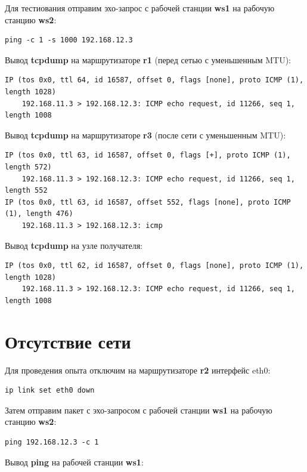 \documentclass[a4paper,12pt]{article}
\begin{document}
Для тестиования отправим эхо-запрос с рабочей станции \textbf{ws1} на рабочую станцию
\textbf{ws2}:

\begin{Verbatim}
ping -c 1 -s 1000 192.168.12.3
\end{Verbatim}

Вывод \textbf{tcpdump} на маршрутизаторе \textbf{r1} (перед сетью с уменьшенным MTU):

\begin{Verbatim}
IP (tos 0x0, ttl 64, id 16587, offset 0, flags [none], proto ICMP (1), length 1028)
    192.168.11.3 > 192.168.12.3: ICMP echo request, id 11266, seq 1, length 1008
\end{Verbatim}

Вывод \textbf{tcpdump} на маршрутизаторе \textbf{r3} (после сети с уменьшенным MTU):

\begin{Verbatim}
IP (tos 0x0, ttl 63, id 16587, offset 0, flags [+], proto ICMP (1), length 572)
    192.168.11.3 > 192.168.12.3: ICMP echo request, id 11266, seq 1, length 552
IP (tos 0x0, ttl 63, id 16587, offset 552, flags [none], proto ICMP (1), length 476)
    192.168.11.3 > 192.168.12.3: icmp
\end{Verbatim}

Вывод \textbf{tcpdump} на узле получателя:

\begin{Verbatim}
IP (tos 0x0, ttl 62, id 16587, offset 0, flags [none], proto ICMP (1), length 1028)
    192.168.11.3 > 192.168.12.3: ICMP echo request, id 11266, seq 1, length 1008
\end{Verbatim}

\section{Отсутствие сети}

Для проведения опыта отключим на маршрутизаторе \textbf{r2} интерфейс eth0:

\begin{Verbatim}
ip link set eth0 down
\end{Verbatim}

Затем отправим пакет с эхо-запросом с рабочей станции \textbf{ws1} на рабочую станцию
\textbf{ws2}:

\begin{Verbatim}
ping 192.168.12.3 -c 1
\end{Verbatim}

Вывод \textbf{ping} на рабочей станции \textbf{ws1}:
\end{document}
